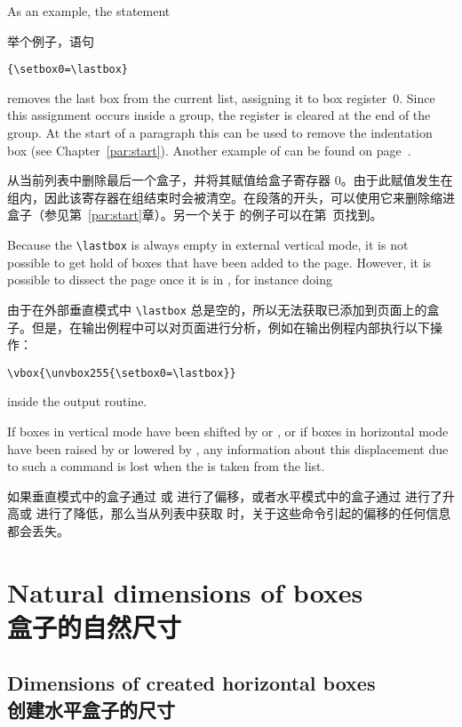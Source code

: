 As an example, the statement 

举个例子，语句
\begin{verbatim}
{\setbox0=\lastbox}
\end{verbatim}
removes
the last box from the current list, assigning it to box
register~0. Since this assignment occurs inside a group,
the register is cleared at the end of the group.
At the start of a paragraph this can be used to remove the
indentation box (see Chapter~\ref{par:start}).
Another example of  can be found on page~\pageref{varioset}.

从当前列表中删除最后一个盒子，并将其赋值给盒子寄存器 0。由于此赋值发生在组内，因此该寄存器在组结束时会被清空。在段落的开头，可以使用它来删除缩进盒子（参见第~\ref{par:start}章）。另一个关于  的例子可以在第\pageref{varioset}~页找到。

Because the \verb-\lastbox- is always empty in external vertical mode,
it is not possible to get hold of boxes that have been 
added to the page. However, it is possible to dissect
the page once it is in , for instance doing

由于在外部垂直模式中 \verb-\lastbox- 总是空的，所以无法获取已添加到页面上的盒子。但是，在输出例程中可以对页面进行分析，例如在输出例程内部执行以下操作：
\begin{verbatim}
\vbox{\unvbox255{\setbox0=\lastbox}}
\end{verbatim}
inside the output routine.

If boxes in vertical mode have been shifted by 
or , or if boxes in horizontal mode  have
been raised by  or lowered by , 
any information about this
displacement due to such a command is lost when
the  is taken from the list.
\awp

如果垂直模式中的盒子通过  或  进行了偏移，或者水平模式中的盒子通过  进行了升高或  进行了降低，那么当从列表中获取  时，关于这些命令引起的偏移的任何信息都会丢失。


\section{Natural dimensions of boxes\\盒子的自然尺寸}

\subsection{Dimensions of created horizontal boxes\\创建水平盒子的尺寸}

